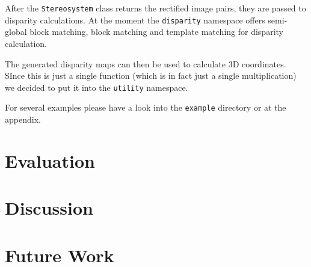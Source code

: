 \documentclass[11pt]{article}
\begin{document}
After the \texttt{Stereosystem} class returns the rectified image pairs, they are passed to disparity calculations. At the moment the \texttt{disparity} namespace offers semi-global block matching, block matching and template matching for disparity calculation.

The generated disparity maps can then be used to calculate 3D coordinates. SInce this is just a single function (which is in fact just a single multiplication) we decided to put it into the \texttt{utility} namespace.

\bigskip
For several examples please have a look into the \texttt{example} directory or at the appendix. %


\section{Evaluation}
\section{Discussion}
\section{Future Work}

\nocite{*}


\end{document}
